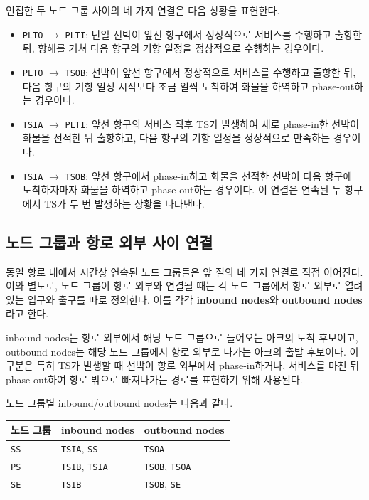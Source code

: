 \documentclass[11pt]{article}
\begin{document}
인접한 두 노드 그룹 사이의 네 가지 연결은 다음 상황을 표현한다.
\begin{itemize}[leftmargin=*]
  \item \texttt{PLTO} $\to$ \texttt{PLTI}: 단일 선박이 앞선 항구에서 정상적으로
  서비스를 수행하고 출항한 뒤, 항해를 거쳐 다음 항구의 기항 일정을 정상적으로
  수행하는 경우이다.
  \item \texttt{PLTO} $\to$ \texttt{TSOB}: 선박이 앞선 항구에서 정상적으로
  서비스를 수행하고 출항한 뒤, 다음 항구의 기항 일정 시작보다 조금 일찍
  도착하여 화물을 하역하고 phase-out하는 경우이다.
  \item \texttt{TSIA} $\to$ \texttt{PLTI}: 앞선 항구의 서비스 직후 TS가 발생하여
  새로 phase-in한 선박이 화물을 선적한 뒤 출항하고, 다음 항구의 기항 일정을
  정상적으로 만족하는 경우이다.
  \item \texttt{TSIA} $\to$ \texttt{TSOB}: 앞선 항구에서 phase-in하고 화물을
  선적한 선박이 다음 항구에 도착하자마자 화물을 하역하고 phase-out하는
  경우이다. 이 연결은 연속된 두 항구에서 TS가 두 번 발생하는 상황을 나타낸다.
\end{itemize}

\subsection{노드 그룹과 항로 외부 사이 연결}

동일 항로 내에서 시간상 연속된 노드 그룹들은 앞 절의 네 가지 연결로 직접
이어진다. 이와 별도로, 노드 그룹이 항로 외부와 연결될 때는 각 노드 그룹에서
항로 외부로 열려 있는 입구와 출구를 따로 정의한다. 이를 각각
\textbf{inbound nodes}와 \textbf{outbound nodes}라고 한다.

inbound nodes는 항로 외부에서 해당 노드 그룹으로 들어오는 아크의 도착 후보이고,
outbound nodes는 해당 노드 그룹에서 항로 외부로 나가는 아크의 출발 후보이다.
이 구분은 특히 TS가 발생할 때 선박이 항로 외부에서 phase-in하거나, 서비스를
마친 뒤 phase-out하여 항로 밖으로 빠져나가는 경로를 표현하기 위해 사용된다.

노드 그룹별 inbound/outbound nodes는 다음과 같다.

\begin{center}
\begin{tabular}{@{}lll@{}}
\toprule
노드 그룹 & inbound nodes & outbound nodes \\
\midrule
\texttt{SS} & \texttt{TSIA}, \texttt{SS} & \texttt{TSOA} \\
\texttt{PS} & \texttt{TSIB}, \texttt{TSIA} & \texttt{TSOB}, \texttt{TSOA} \\
\texttt{SE} & \texttt{TSIB} & \texttt{TSOB}, \texttt{SE} \\
\bottomrule
\end{tabular}
\end{center}
\end{document}
